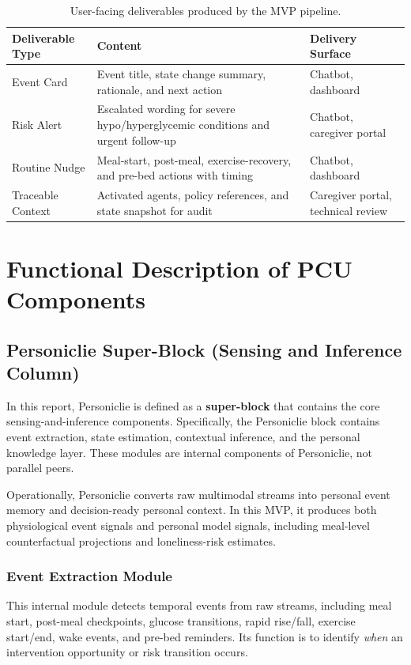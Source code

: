 \documentclass[11pt]{article}
\begin{document}
\begin{table}[h]
\centering
\begin{tabularx}{\textwidth}{>{\raggedright\arraybackslash}p{} >{\raggedright\arraybackslash}X >{\raggedright\arraybackslash}p{}}
\toprule
Deliverable Type & Content & Delivery Surface \\
\midrule
Event Card & Event title, state change summary, rationale, and next action & Chatbot, dashboard \\
Risk Alert & Escalated wording for severe hypo/hyperglycemic conditions and urgent follow-up & Chatbot, caregiver portal \\
Routine Nudge & Meal-start, post-meal, exercise-recovery, and pre-bed actions with timing & Chatbot, dashboard \\
Traceable Context & Activated agents, policy references, and state snapshot for audit & Caregiver portal, technical review \\
\bottomrule
\end{tabularx}
\caption{User-facing deliverables produced by the MVP pipeline.}
\label{tab:deliverables}
\end{table}

\section{Functional Description of PCU Components}
\subsection{Personiclie Super-Block (Sensing and Inference Column)}
In this report, Personiclie is defined as a \textbf{super-block} that contains the core sensing-and-inference components. Specifically, the Personiclie block contains event extraction, state estimation, contextual inference, and the personal knowledge layer. These modules are internal components of Personiclie, not parallel peers.

Operationally, Personiclie converts raw multimodal streams into personal event memory and decision-ready personal context. In this MVP, it produces both physiological event signals and personal model signals, including meal-level counterfactual projections and loneliness-risk estimates.

\subsubsection{Event Extraction Module}
This internal module detects temporal events from raw streams, including meal start, post-meal checkpoints, glucose transitions, rapid rise/fall, exercise start/end, wake events, and pre-bed reminders. Its function is to identify \emph{when} an intervention opportunity or risk transition occurs.
\end{document}
